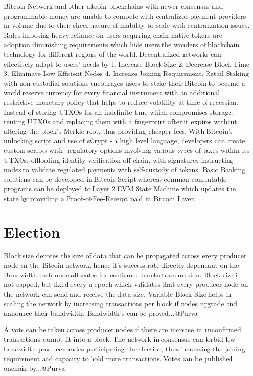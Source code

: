 \documentclass[a4paper,11pt]{article}
\begin{document}
Bitcoin Network and other altcoin blockchains with newer consensus and programmable money are unable to compete with centralized payment providers in volume due to their sheer nature of inability to scale with centralization issues. Rules imposing heavy reliance on users acquiring chain native tokens are adoption diminishing requirements which hide users the wonders of blockchain technology for different regions of the world. Decentralized networks can effectively adapt to users' needs by 1. Increase Block Size 2. Decrease Block Time 3. Eliminate Low Efficient Nodes 4. Increase Joining Requirement. Retail Staking with non-custodial solutions encourages users to stake their Bitcoin to become a world reserve currency for every financial instrument with an additional restrictive monetary policy that helps to reduce volatility at time of recession.\\
\indent Instead of storing UTXOs for an indefinite time which compromises storage, renting UTXOs and replacing them with a fingerprint after it expires without altering the block's Merkle root, thus providing cheaper fees. With Bitcoin's unlocking script and use of sCrypt - a high level language, developers can create custom scripts with -regulatory options involving various types of taxes within its UTXOs, offloading identity verification off-chain, with signatures instructing nodes to validate regulated payments with self-custody of tokens. Basic Banking solutions can be developed in Bitcoin Script whereas common computable programs can be deployed to Layer 2 EVM State Machine which updates the state by providing a Proof-of-Fee-Receipt paid in Bitcoin Layer. 

\section{Election}
Block size denotes the size of data that can be propagated across every producer node on the Bitcoin network, hence it's success rate directly dependant on the Bandwidth each node allocates for confirmed blocks transmission. Block size is not capped, but fixed every n epoch which validates that every producer node on the network can send and receive the data size. Variable Block Size helps in scaling the network by increasing transactions per block if nodes upgrade and announce their bandwidth. Bandwidth's can be proved...@Purva

A vote can be taken across producer nodes if there are increase in unconfirmed transactions cannot fit into a block. The network in consensus can forbid low bandwidth producer nodes participating the election, thus increasing the joining requirement and capacity to hold more transactions. Votes can be published onchain by...@Purva
\end{document}
